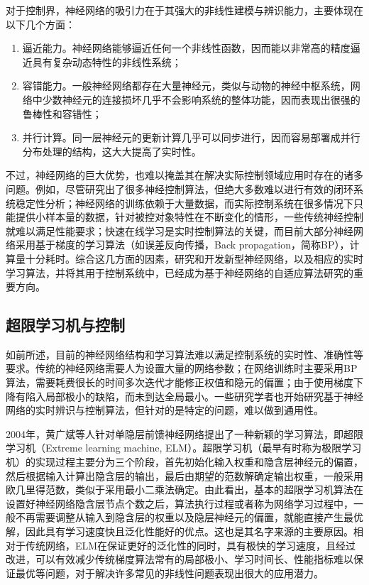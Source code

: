 对于控制界，神经网络的吸引力在于其强大的非线性建模与辨识能力，主要体现在以下几个方面：
\begin{enumerate}
\item 逼近能力。神经网络能够逼近任何一个非线性函数，因而能以非常高的精度逼近具有复杂动态特性的非线性系统；
\item 容错能力。一般神经网络都存在大量神经元，类似与动物的神经中枢系统，网络中少数神经元的连接损坏几乎不会影响系统的整体功能，因而表现出很强的鲁棒性和容错性；
\item 并行计算。同一层神经元的更新计算几乎可以同步进行，因而容易部署成并行分布处理的结构，这大大提高了实时性。
\end{enumerate}

不过，神经网络的巨大优势，也难以掩盖其在解决实际控制领域应用时存在的诸多问题。例如，尽管研究出了很多神经控制算法，但绝大多数难以进行有效的闭环系统稳定性分析；神经网络的训练依赖于大量数据，而实际控制系统在很多情况下只能提供小样本量的数据，针对被控对象特性在不断变化的情形，一些传统神经控制就难以满足性能要求；快速在线学习是实时控制算法的关键，而目前大部分神经网络采用基于梯度的学习算法（如误差反向传播，Back propagation，简称BP），计算量十分耗时。综合这几方面的因素，研究和开发新型神经网络，以及相应的实时学习算法，并将其用于控制系统中，已经成为基于神经网络的自适应算法研究的重要方向。

\subsection{超限学习机与控制}

如前所述，目前的神经网络结构和学习算法难以满足控制系统的实时性、准确性等要求。传统的神经网络需要人为设置大量的网络参数；在网络训练时主要采用BP算法，需要耗费很长的时间多次迭代才能修正权值和隐元的偏置；由于使用梯度下降有陷入局部极小的缺陷，而未到达全局最小。一些研究学者也开始研究基于神经网络的实时辨识与控制算法，但针对的是特定的问题，难以做到通用性。

2004年，黄广斌等人针对单隐层前馈神经网络提出了一种新颖的学习算法，即超限学习机（Extreme learning machine, ELM）。超限学习机（最早有时称为极限学习机）的实现过程主要分为三个阶段，首先初始化输入权重和隐含层神经元的偏置，然后根据输入计算出隐含层的输出，最后由期望的范数解确定输出权重，一般采用欧几里得范数，类似于采用最小二乘法确定。由此看出，基本的超限学习机算法在设置好神经网络隐含层节点个数之后，算法执行过程或者称为网络学习过程中，一般不再需要调整从输入到隐含层的权重以及隐层神经元的偏置，就能直接产生最优解，因此具有学习速度快且泛化性能好的优点。这也是其名字来源的主要原因。相对于传统网络，ELM在保证更好的泛化性的同时，具有极快的学习速度，且经过改进，可以有效减少传统梯度算法常有的局部极小、学习时间长、性能指标难以保证最优等问题，对于解决许多常见的非线性问题表现出很大的应用潜力。

